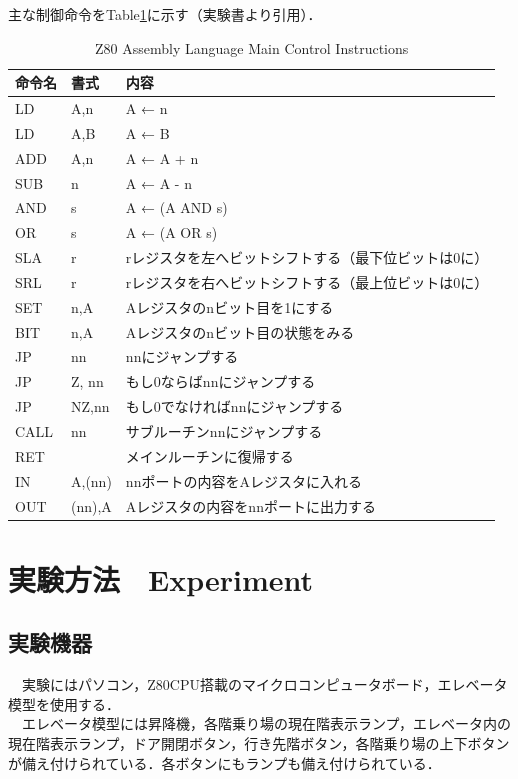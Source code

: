 主な制御命令をTable\ref{table:ControlInstructions}に示す（実験書より引用）．
\begin{table}[hbtp]
    \caption{Z80 Assembly Language Main Control Instructions}
    \label{table:ControlInstructions}
    \centering
    \begin{tabular}{lll}
    \hline
    命令名 & 書式 & 内容\\
    \hline \hline
    LD   & A,n    & A ← n\\
    LD   & A,B    & A ← B\\
    ADD  & A,n    & A ← A + n\\
    SUB  & n      & A ← A - n\\
    AND  & s      & A ← (A AND s)\\
    OR   & s      & A ← (A OR s)\\
    SLA  & r      & rレジスタを左へビットシフトする（最下位ビットは0に）\\
    SRL  & r      & rレジスタを右へビットシフトする（最上位ビットは0に）\\
    SET  & n,A    & Aレジスタのnビット目を1にする\\
    BIT  & n,A    & Aレジスタのnビット目の状態をみる\\
    JP   & nn     & nnにジャンプする\\
    JP   & Z, nn  & もし0ならばnnにジャンプする\\
    JP   & NZ,nn  & もし0でなければnnにジャンプする\\
    CALL & nn     & サブルーチンnnにジャンプする\\
    RET  &        & メインルーチンに復帰する\\
    IN   & A,(nn) & nnポートの内容をAレジスタに入れる\\
    OUT  & (nn),A & Aレジスタの内容をnnポートに出力する\\
    \hline
    \end{tabular}
\end{table}


\section{実験方法　Experiment}
\subsection{実験機器}
　実験にはパソコン，Z80CPU搭載のマイクロコンピュータボード，エレベータ模型を使用する．\\
　エレベータ模型には昇降機，各階乗り場の現在階表示ランプ，エレベータ内の現在階表示ランプ，ドア開閉ボタン，行き先階ボタン，各階乗り場の上下ボタンが備え付けられている．各ボタンにもランプも備え付けられている．

